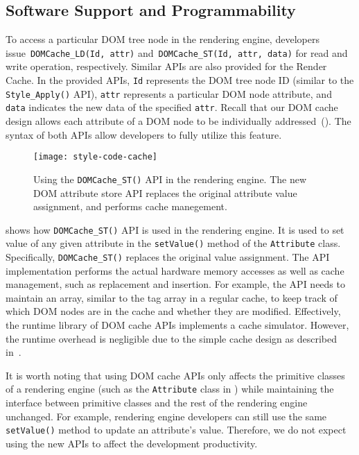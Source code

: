 \subsection{Software Support and Programmability}
\label{sec:cache:sw}

To access a particular DOM tree node in the rendering engine, developers issue~\texttt{DOMCache\_LD(Id, attr)} and~\texttt{DOMCache\_ST(Id, attr, data)} for read and write operation, respectively. Similar APIs are also provided for the Render Cache. In the provided APIs, \texttt{Id} represents the DOM tree node ID (similar to the \texttt{Style\_Apply()} API), \texttt{attr} represents a particular DOM node attribute, and \texttt{data} indicates the new data of the specified \texttt{attr}. Recall that our DOM cache design allows each attribute of a DOM node to be individually addressed~(). The syntax of both APIs allow developers to fully utilize this feature.

\begin{figure}[b]
\centering
\captionsetup{width=\columnwidth}
\texttt{[image: style-code-cache]}
\caption{\small{Using the \texttt{DOMCache\_ST()} API in the rendering engine. The new DOM attribute store API replaces the original attribute value assignment, and performs cache manegement.}}
\label{fig:style-code-cache}
\end{figure}

 shows how \texttt{DOMCache\_ST()} API is used in the rendering engine. It is used to set value of any given attribute in the \texttt{setValue()} method of the \texttt{Attribute} class. Specifically, \texttt{DOMCache\_ST()} replaces the original value assignment. The API implementation performs the actual hardware memory accesses as well as cache management, such as replacement and insertion. For example, the API needs to maintain an array, similar to the tag array in a regular cache, to keep track of which DOM nodes are in the cache and whether they are modified.  Effectively, the runtime library of DOM cache APIs implements a cache simulator. However, the runtime overhead is negligible due to the simple cache design as described in~.

It is worth noting that using DOM cache APIs only affects the primitive classes of a rendering engine (such as the \texttt{Attribute} class in ) while maintaining the interface between primitive classes and the rest of the rendering engine unchanged. For example, rendering engine developers can still use the same \texttt{setValue()} method to update an attribute's value. Therefore, we do not expect using the new APIs to affect the development productivity.

